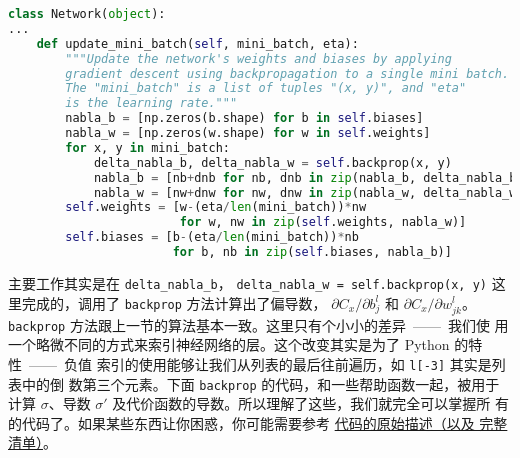 \begin{lstlisting}[language=Python]
class Network(object):
...
    def update_mini_batch(self, mini_batch, eta):
        """Update the network's weights and biases by applying
        gradient descent using backpropagation to a single mini batch.
        The "mini_batch" is a list of tuples "(x, y)", and "eta"
        is the learning rate."""
        nabla_b = [np.zeros(b.shape) for b in self.biases]
        nabla_w = [np.zeros(w.shape) for w in self.weights]
        for x, y in mini_batch:
            delta_nabla_b, delta_nabla_w = self.backprop(x, y)
            nabla_b = [nb+dnb for nb, dnb in zip(nabla_b, delta_nabla_b)]
            nabla_w = [nw+dnw for nw, dnw in zip(nabla_w, delta_nabla_w)]
        self.weights = [w-(eta/len(mini_batch))*nw
                        for w, nw in zip(self.weights, nabla_w)]
        self.biases = [b-(eta/len(mini_batch))*nb
                       for b, nb in zip(self.biases, nabla_b)]
\end{lstlisting}

主要工作其实是在 \lstinline!delta_nabla_b!，%
\lstinline!delta_nabla_w = self.backprop(x, y)! 这里完成的，调用了
\lstinline!backprop! 方法计算出了偏导数，
$\partial C_x/\partial b_j^l$ 和 $\partial C_x/\partial w_{jk}^l$。
\lstinline!backprop! 方法跟上一节的算法基本一致。这里只有个小小的差异~——~我们使
用一个略微不同的方式来索引神经网络的层。这个改变其实是为了 Python 的特性~——~负值
索引的使用能够让我们从列表的最后往前遍历，如 \lstinline!l[-3]!  其实是列表中的倒
数第三个元素。下面 \lstinline!backprop! 的代码，和一些帮助函数一起，被用于计算
$\sigma$、导数 $\sigma'$ 及代价函数的导数。所以理解了这些，我们就完全可以掌握所
有的代码了。如果某些东西让你困惑，你可能需要参考%
\hyperref[sec:implementing_our_network_to_classify_digits]{代码的原始描述（以及
    完整清单）}。

